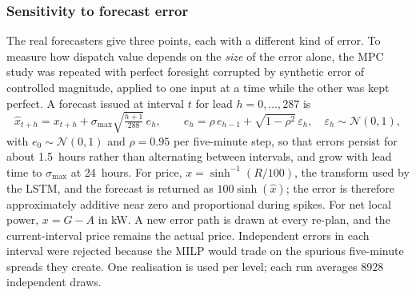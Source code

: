 \subsubsection{Sensitivity to forecast error}
\label{sec:results:mpc:noise}

The real forecasters give three points, each with a different kind of error. To measure
how dispatch value depends on the \emph{size} of the error alone, the MPC study was
repeated with perfect foresight corrupted by synthetic error of controlled magnitude,
applied to one input at a time while the other was kept perfect. A forecast issued at
interval $t$ for lead $h = 0, \dots, 287$ is
\begin{equation}
    \hat{x}_{t+h} = x_{t+h} + \sigma_{\max} \sqrt{\tfrac{h+1}{288}}\, e_h,
    \qquad e_h = \rho\, e_{h-1} + \sqrt{1-\rho^2}\, \varepsilon_h, \quad \varepsilon_h \sim \mathcal{N}(0,1),
    \label{eq:noise}
\end{equation}
with $e_0 \sim \mathcal{N}(0,1)$ and $\rho = 0.95$ per five-minute step, so that errors
persist for about 1.5~hours rather than alternating between intervals, and grow with lead
time to $\sigma_{\max}$ at 24~hours. For price, $x = \sinh^{-1}(R/100)$, the transform
used by the LSTM, and the forecast is returned as $100 \sinh(\hat{x})$; the error is
therefore approximately additive near zero and proportional during spikes. For net
local power, $x = G - A$ in kW. A new error path is drawn at every re-plan, and the
current-interval price remains the actual price. Independent errors in each interval
were rejected because the MILP would trade on the spurious five-minute spreads they
create. One realisation is used per level; each run averages 8928 independent draws.

